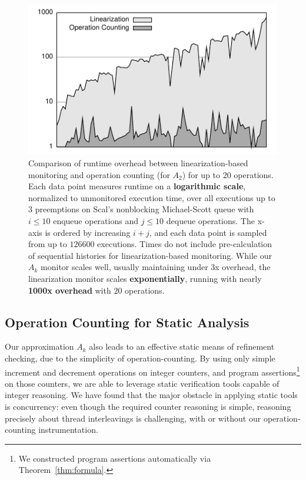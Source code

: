 \begin{figure}[t]
  \centering
  \includegraphics[width=\linewidth]{figures/lin-vs-counting-time}
  \caption{Comparison of runtime overhead between linearization-based monitoring
    and operation counting (for $A_2$) for up to $20$ operations. Each data
    point measures runtime on a \textbf{logarithmic scale}, normalized to
    unmonitored execution time, over all executions up to $3$ preemptions on
    Scal's nonblocking Michael-Scott queue with $i\!\le\!10$ enqueue operations
    and $j\!\le\!10$ dequeue operations. The x-axis is ordered by increasing
    $i\!+\!j$, and each data point is sampled from up to $126600$ executions.
    Times do not include pre-calculation of sequential histories for
    linearization-based monitoring. While our $A_k$ monitor scales well,
    usually maintaining under 3x overhead, the linearization monitor scales
    \textbf{exponentially}, running with nearly \textbf{1000x overhead}
    with $20$ operations.
  }
  \label{fig:data:runtime}
\end{figure}

\subsection{Operation Counting for Static Analysis}
\label{sec:exp:static}

Our approximation $A_k$ also leads to an effective static means of refinement
checking, due to the simplicity of operation-counting. By using only simple
increment and decrement operations on integer counters, and program
assertions\footnote{We constructed program assertions automatically via
Theorem~\ref{thm:formula}.} on those counters, we are able to leverage static
verification tools capable of integer reasoning. We have found that the major
obstacle in applying static tools is concurrency: even though the required
counter reasoning is simple, reasoning precisely about thread interleavings is
challenging, with or without our operation-counting instrumentation.

